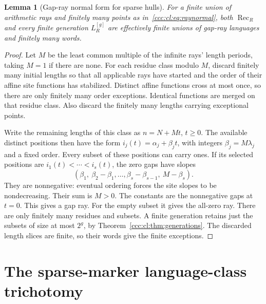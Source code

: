 \documentclass[11pt,letterpaper]{article}
\newtheorem{lemma}[theorem]{Lemma}
\theoremstyle{definition}
\theoremstyle{remark}
\newcommand{\rec}{\operatorname{Rec}}
\newcommand{\gen}[2]{#1^{[#2]}}
\begin{document}
\begin{lemma}[Gap-ray normal form for sparse hulls]\label{ccc:cl:lem:gapnormal}
For a finite union of arithmetic rays and finitely many points as
in~\eqref{ccc:cl:eq:raynormal}, both $\rec_R$ and every finite generation
$\gen{L_R}g$ are effectively finite unions of gap-ray languages and
finitely many words.
\end{lemma}
\begin{proof}
Let $M$ be the least common multiple of the infinite rays' length
periods, taking $M=1$ if there are none. For each residue class modulo
$M$, discard finitely many initial lengths so that all applicable rays
have started and the order of their affine site functions has stabilized.
Distinct affine functions cross at most once, so there are only finitely
many order exceptions. Identical functions are merged on that residue
class. Also discard the finitely many lengths carrying exceptional points.

Write the remaining lengths of this class as $n=N+Mt$, $t\ge0$.
The available distinct positions then have the form
$i_j(t)=\alpha_j+\beta_j t$, with integers $\beta_j=M\lambda_j$ and a
fixed order. Every subset of these positions can carry ones. If its
selected positions are $i_1(t)<\cdots<i_s(t)$, the zero gaps have slopes
\begin{equation}\label{ccc:cl:eq:gapslopes}
 (\beta_1,\ \beta_2-\beta_1,\ldots,
       \beta_s-\beta_{s-1},\ M-\beta_s).
\end{equation}
They are nonnegative: eventual ordering forces the site slopes to be
nondecreasing. Their sum is $M>0$. The constants are the nonnegative gaps
at $t=0$. This gives a gap ray. For the empty subset it gives the all-zero
ray. There are only finitely many residues and subsets. A finite
generation retains just the subsets of size at most $2^g$, by
Theorem~\ref{ccc:cl:thm:generations}. The discarded length slices are finite,
so their words give the finite exceptions.
\end{proof}

\section{The sparse-marker language-class trichotomy}\label{ccc:cl:sec:classification}
\end{document}
